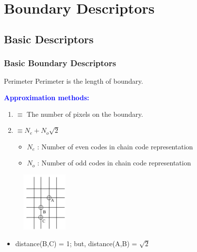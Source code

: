 \documentclass[english,11pt,table,handout]{beamer}
\begin{document}
\section{Boundary Descriptors}
\subsection{Basic Descriptors}
\frame
{
	\frametitle{Basic Boundary Descriptors}
	\large
	\begin{block}{Perimeter}
		Perimeter is the length of boundary.
		
		\textcolor{blue}{\textbf{Approximation methods:}}
		\begin{enumerate}
			\item $\equiv$ The number of pixels on the boundary.
			\item $\equiv N_e + N_o\sqrt{2}$
			\begin{itemize}
				\item $N_e$ : Number of even codes in chain code representation
				\item $N_o$ : Number of odd codes in chain code representation
			\end{itemize}
		\end{enumerate}
	\end{block}
	\begin{figure}[!h]
		\includegraphics[height=3cm]{perimeter.png}
	\end{figure}
	\begin{itemize}
		\item distance(B,C) = 1; but, distance(A,B) = $\sqrt{2}$
	\end{itemize}
}
\end{document}
